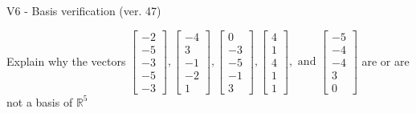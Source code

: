 \begin{exercise}
  \begin{exerciseTitle}V6 - Basis verification (ver. 47)\end{exerciseTitle}
  \begin{exerciseStatement}
    Explain why the vectors \(\left[\begin{array}{r}
-2 \\
-5 \\
-3 \\
-5 \\
-3
\end{array}\right] , \left[\begin{array}{r}
-4 \\
3 \\
-1 \\
-2 \\
1
\end{array}\right] , \left[\begin{array}{r}
0 \\
-3 \\
-5 \\
-1 \\
3
\end{array}\right] , \left[\begin{array}{r}
4 \\
1 \\
4 \\
1 \\
1
\end{array}\right] , \text{ and } \left[\begin{array}{r}
-5 \\
-4 \\
-4 \\
3 \\
0
\end{array}\right]\) are or are not a basis of \(\mathbb{R}^5\)	



\end{exerciseStatement}
\end{exercise}

